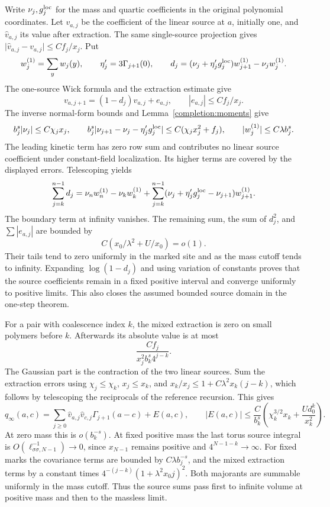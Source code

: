 \documentclass[11pt]{article}
\begin{document}
Write \(\nu_j,g_j^{\rm loc}\) for the mass and quartic
coefficients in the original polynomial coordinates. Let \(v_{a,j}\)
be the coefficient of the linear source at \(a\), initially one,
and \(\widehat v_{a,j}\) its value after extraction. The same
single-source projection gives
\(\lvert\widehat v_{a,j}-v_{a,j}\rvert\le Cf_j/x_j\).
Put
\[
 w_j^{(1)}=\sum_yw_j(y),\qquad \eta'_j=3\Gamma_{j+1}(0),
 \qquad
 d_j=(\nu_j+\eta'_jg_j^{\rm loc})w_{j+1}^{(1)}-\nu_jw_j^{(1)}.
\]
The one-source Wick formula and the extraction estimate give
\[
 v_{a,j+1}=(1-d_j)v_{a,j}+e_{a,j},
 \qquad |e_{a,j}|\le Cf_j/x_j.
\]
The inverse normal-form bounds and Lemma~\ref{completion:moments}
give
\[
 b_j^s|\nu_j|\le C\chi_jx_j,
 \qquad
 b_j^s|\nu_{j+1}-\nu_j-\eta'_jg_j^{\rm loc}|
          \le C(\chi_jx_j^2+f_j),\qquad
 |w_j^{(1)}|\le C\lambda b_j^s.
\]
The leading kinetic term has zero row sum and contributes no linear
source coefficient under constant-field localization. Its higher
terms are covered by the displayed errors.
Telescoping yields
\[
 \sum_{j=k}^{n-1}d_j
 =\nu_nw_n^{(1)}-\nu_kw_k^{(1)}
 +\sum_{j=k}^{n-1}(\nu_j+\eta'_jg_j^{\rm loc}-\nu_{j+1})w_{j+1}^{(1)}.
\]
The boundary term at infinity vanishes. The remaining sum, the sum
of \(d_j^2\), and \(\sum|e_{a,j}|\) are bounded by
\[
 C\left(x_0/\lambda^2+U/x_0\right)=o(1).
\]
Their tails tend to zero uniformly in the marked site and as the
mass cutoff tends to infinity. Expanding \(\log(1-d_j)\) and using
variation of constants proves that the source coefficients remain
in a fixed positive interval and converge uniformly to positive
limits. This also closes the assumed bounded source domain in the
one-step theorem.

For a pair with coalescence index \(k\), the mixed extraction is zero
on small polymers before \(k\). Afterwards its absolute value is at
most
\[
 \frac{Cf_j}{x_j^2 b_k^s4^{j-k}}.
\]
The Gaussian part is the contraction of the two linear sources.
Sum the extraction errors using \(\chi_j\le\chi_k\), \(x_j\le x_k\),
and \(x_k/x_j\le 1+C\lambda^2x_k(j-k)\), which follows by
telescoping the reciprocals of the reference recursion. This gives
\begin{equation}\label{frac:source-input}
 q_\infty(a,c)=\sum_{j\ge0}\widehat v_{a,j}
                 \widehat v_{c,j}\Gamma_{j+1}(a-c)+E(a,c),
 \qquad
 |E(a,c)|\le\frac C{b_k^s}
       \left(\chi_k^{3/2}x_k+\frac{Ud_0^k}{x_k^2}\right).
\end{equation}
At zero mass this is \(o(b_k^{-s})\). At fixed positive mass the
last torus source integral is
\(O(\ell_{\sigma\sigma,N-1}^{-1})\to0\), since
\(x_{N-1}\) remains positive and \(4^{N-1-k}\to\infty\).
For fixed marks the covariance terms are bounded by
\(C\lambda b_j^{-s}\), and the mixed extraction terms by a
constant times \(4^{-(j-k)}(1+\lambda^2x_0j)^2\).
Both majorants are summable uniformly in the mass cutoff.
Thus the source sums pass first to infinite volume at positive
mass and then to the massless limit.
\end{document}
